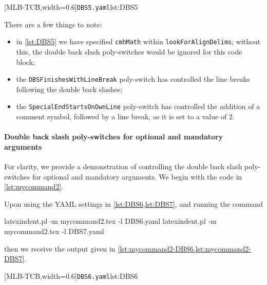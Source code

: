		\begin{cmhtcbraster}[
				raster force size=false,
				raster column 1/.style={add to width=-.1\textwidth},
				raster column skip=.06\linewidth]
			[MLB-TCB,width=0.6\textwidth]{\texttt{DBS5.yaml}}{lst:DBS5}
		\end{cmhtcbraster}

		There are a few things to note:
		\begin{itemize}
			\item in \cref{lst:DBS5} we have specified \texttt{cmhMath} within \texttt{lookForAlignDelims};
			      without this, the double back slash poly-switches would be ignored for this code block;
			\item the \texttt{DBSFinishesWithLineBreak} poly-switch has controlled the line breaks
			      following the double back slashes;
			\item the \texttt{SpecialEndStartsOnOwnLine} poly-switch has controlled the addition of a
			      comment symbol, followed by a line break, as it is set to a value of 2.
		\end{itemize}

	\paragraph{Double back slash poly-switches for optional and mandatory arguments}
		For clarity, we provide a demonstration of controlling the double back slash
		poly-switches for optional and mandatory arguments. We begin with the code in
		\cref{lst:mycommand2}. 


		Upon using the YAML settings in \cref{lst:DBS6,lst:DBS7}, and running the command
		 
		\begin{commandshell}
latexindent.pl -m mycommand2.tex -l DBS6.yaml
latexindent.pl -m mycommand2.tex -l DBS7.yaml
\end{commandshell}
		then we receive the output given in \cref{lst:mycommand2-DBS6,lst:mycommand2-DBS7}.

		\begin{cmhtcbraster}[
				raster force size=false,
				raster column 1/.style={add to width=-.1\textwidth},
				raster column skip=.03\linewidth]
			[MLB-TCB,width=0.6\textwidth]{\texttt{DBS6.yaml}}{lst:DBS6}
		\end{cmhtcbraster}

